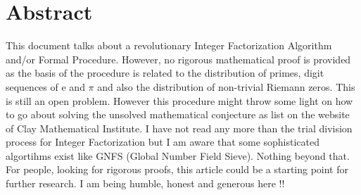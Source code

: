 \section{Abstract}

This document talks about a revolutionary Integer Factorization Algorithm  and/or Formal Procedure. However, no rigorous mathematical proof is provided as the basis of the procedure is related to the distribution of primes, digit sequences of e and $\pi$ and also the distribution of non-trivial Riemann zeros. This is still an open problem. However this procedure might throw some light on how to go about solving the unsolved mathematical conjecture as list on the website of Clay Mathematical Institute. I have not read any more than the trial division process for Integer Factorization but I am aware that some sophisticated algortihms exist like GNFS (Global Number Field Sieve). Nothing beyond that. For people, looking for rigorous proofs, this article could be a starting point for further research. I am being humble, honest and generous here !!
